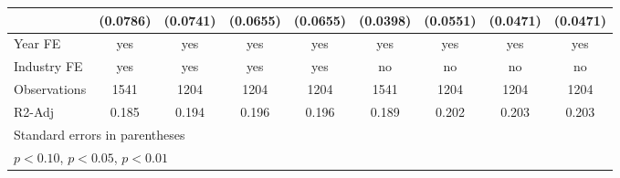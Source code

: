 \begin{table}[htbp]
\begin{tabular}{l*{8}{c}}
                    &    (0.0786)         &    (0.0741)         &    (0.0655)         &    (0.0655)         &    (0.0398)         &    (0.0551)         &    (0.0471)         &    (0.0471)         \\
\hline
Year FE             &         yes         &         yes         &         yes         &         yes         &         yes         &         yes         &         yes         &         yes         \\
Industry FE         &         yes         &         yes         &         yes         &         yes         &          no         &          no         &          no         &          no         \\
Observations        &        1541         &        1204         &        1204         &        1204         &        1541         &        1204         &        1204         &        1204         \\
R2-Adj              &       0.185         &       0.194         &       0.196         &       0.196         &       0.189         &       0.202         &       0.203         &       0.203         \\
\hline\hline
\multicolumn{9}{l}{\footnotesize Standard errors in parentheses}\\
\multicolumn{9}{l}{\footnotesize \sym{*} \(p<0.10\), \sym{**} \(p<0.05\), \sym{***} \(p<0.01\)}\\
\end{tabular}
\end{table}
